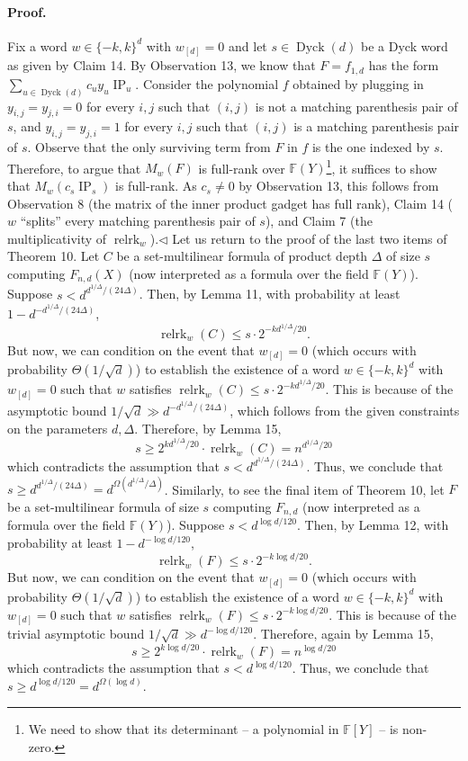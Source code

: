 \paragraph{Proof.} Fix a word $w\in\{-k,k\}^d$ with $w_{[d]}=0$ and let $s\in\operatorname{Dyck}(d)$ be a Dyck word as given by Claim 14. By Observation 13, we know that $F=f_{1,d}$ has the form $\sum_{u\in\operatorname{Dyck}(d)}c_u y_u\operatorname{IP}_u$. Consider the polynomial $f$ obtained by plugging in $y_{i,j}=y_{j,i}=0$ for every $i,j$ such that $(i,j)$ is not a matching parenthesis pair of $s$, and $y_{i,j}=y_{j,i}=1$ for every $i,j$ such that $(i,j)$ is a matching parenthesis pair of $s$. Observe that the only surviving term from $F$ in $f$ is the one indexed by $s$. Therefore, to argue that $M_w(F)$ is full-rank over $\mathbb F(Y)$\footnote{We need to show that its determinant -- a polynomial in $\mathbb F[Y]$ -- is non-zero.}, it suffices to show that $M_w(c_s\operatorname{IP}_s)$ is full-rank. As $c_s\neq0$ by Observation 13, this follows from Observation 8 (the matrix of the inner product gadget has full rank), Claim 14 ($w$ ``splits'' every matching parenthesis pair of $s$), and Claim 7 (the multiplicativity of $\operatorname{relrk}_w$).\hfill$\triangleleft$
Let us return to the proof of the last two items of Theorem 10. Let $C$ be a set-multilinear formula of product depth $\Delta$ of size $s$ computing $F_{n,d}(X)$ (now interpreted as a formula over the field $\mathbb F(Y)$). Suppose $s<d^{d^{1/\Delta}/(24\Delta)}$. Then, by Lemma 11, with probability at least $1-d^{-d^{1/\Delta}/(24\Delta)}$,
\[\operatorname{relrk}_w(C)\leq s\cdot2^{-kd^{1/\Delta}/20}.\]
But now, we can condition on the event that $w_{[d]}=0$ (which occurs with probability $\Theta(1/\sqrt d)$) to establish the existence of a word $w\in\{-k,k\}^d$ with $w_{[d]}=0$ such that $w$ satisfies $\operatorname{relrk}_w(C)\leq s\cdot2^{-kd^{1/\Delta}/20}$. This is because of the asymptotic bound $1/\sqrt d\gg d^{-d^{1/\Delta}/(24\Delta)}$, which follows from the given constraints on the parameters $d,\Delta$. Therefore, by Lemma 15,
\[s\geq2^{kd^{1/\Delta}/20}\cdot\operatorname{relrk}_w(C)=n^{d^{1/\Delta}/20}\]
which contradicts the assumption that $s<d^{d^{1/\Delta}/(24\Delta)}$. Thus, we conclude that $s\geq d^{d^{1/\Delta}/(24\Delta)}=d^{\Omega(d^{1/\Delta}/\Delta)}$.
Similarly, to see the final item of Theorem 10, let $F$ be a set-multilinear formula of size $s$ computing $F_{n,d}$ (now interpreted as a formula over the field $\mathbb F(Y)$). Suppose $s<d^{\log d/120}$. Then, by Lemma 12, with probability at least $1-d^{-\log d/120}$,
\[\operatorname{relrk}_w(F)\leq s\cdot2^{-k\log d/20}.\]
But now, we can condition on the event that $w_{[d]}=0$ (which occurs with probability $\Theta(1/\sqrt d)$) to establish the existence of a word $w\in\{-k,k\}^d$ with $w_{[d]}=0$ such that $w$ satisfies $\operatorname{relrk}_w(F)\leq s\cdot2^{-k\log d/20}$. This is because of the trivial asymptotic bound $1/\sqrt d\gg d^{-\log d/120}$. Therefore, again by Lemma 15,
\[s\geq2^{k\log d/20}\cdot\operatorname{relrk}_w(F)=n^{\log d/20}\]
which contradicts the assumption that $s<d^{\log d/120}$. Thus, we conclude that $s\geq d^{\log d/120}=d^{\Omega(\log d)}$.
